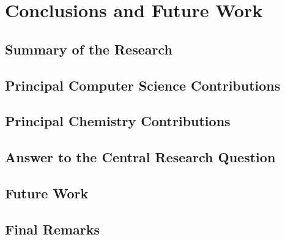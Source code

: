 
\chapter{Conclusions and Future Work}\label{ch:conclusions}

    \section{Summary of the Research}\label{sec:research-summary}

    \section{Principal Computer Science Contributions}\label{sec:cs-contributions}

    \section{Principal Chemistry Contributions}\label{sec:chemistry-contributions}

    \section{Answer to the Central Research Question}\label{sec:research-question-answer}

    \section{Future Work}\label{sec:future-work}

    \section{Final Remarks}\label{sec:final-remarks}
